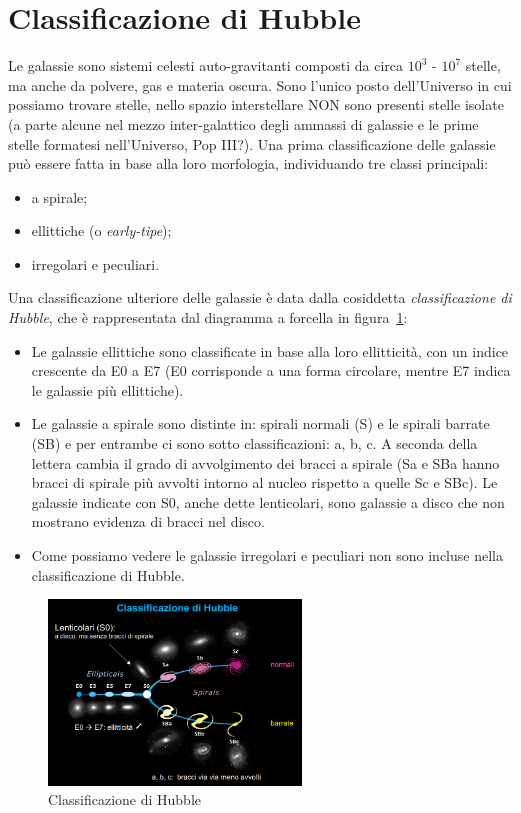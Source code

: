 \section{Classificazione di Hubble}\label{sec:classificazione-di-hubble}
Le galassie sono sistemi celesti auto-gravitanti composti da circa $10^3$ - $10^7$ stelle, ma anche da polvere, gas e materia oscura. Sono l'unico posto dell'Universo in cui possiamo trovare stelle, nello spazio interstellare NON sono presenti stelle isolate (a parte alcune nel mezzo inter-galattico degli ammassi di galassie e le prime stelle formatesi nell’Universo, Pop III?).
Una prima classificazione delle galassie può essere fatta in base alla loro morfologia, individuando tre classi principali:
\begin{itemize}
	\item a spirale;
	\item ellittiche (o \textit{early-tipe});
	\item irregolari e peculiari.
\end{itemize}

Una classificazione ulteriore delle galassie è data dalla cosiddetta \emph{classificazione di Hubble}, che è rappresentata
dal diagramma a forcella in figura~\ref{fig:classificazione-di-hubble}:
\begin{itemize}
	\item Le galassie ellittiche sono classificate in base alla loro ellitticità, con un indice crescente da E0 a E7 (E0 corrisponde a una forma circolare, mentre E7 indica le galassie più ellittiche).
	\item Le galassie a spirale sono distinte in: spirali normali (S) e le spirali barrate (SB) e per entrambe ci sono sotto classificazioni: a, b, c. A seconda della lettera cambia il grado di avvolgimento dei bracci a spirale (Sa e SBa hanno bracci di spirale più avvolti intorno al nucleo rispetto a quelle Sc e SBc). Le galassie indicate con S0, anche dette lenticolari, sono galassie a disco che non mostrano evidenza di bracci nel disco.
	\item Come possiamo vedere le galassie irregolari e peculiari non sono incluse nella classificazione di Hubble.
\end{itemize}

\begin{figure}
	\centering
	\includegraphics[width=0.6\textwidth]{immagini/classificazione-di-hubble.png}
	\caption{Classificazione di Hubble}
	\label{fig:classificazione-di-hubble}
\end{figure}

